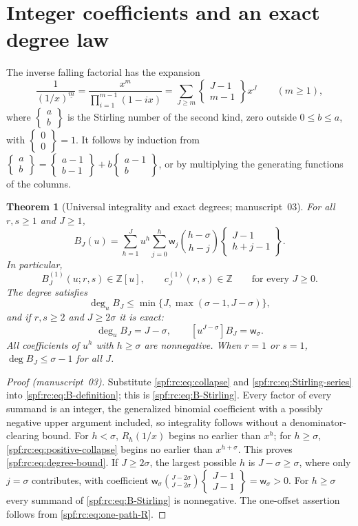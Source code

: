 \documentclass[11pt]{article}
\numberwithin{equation}{section}
\newtheorem{theorem}{Theorem}[section]
\theoremstyle{definition}
\theoremstyle{remark}
\theoremstyle{definition}
\newcommand{\Z}{\mathbb Z}
\newcommand{\fall}[2]{{#1}^{\underline{#2}}}
\newcommand{\rcw}{\mathsf w}
\newcommand{\Stir}[2]{\left\{\begin{matrix}#1\\#2\end{matrix}\right\}}
\begin{document}
\section{Integer coefficients and an exact degree law}
\label{spf:rc:sec:integrality}

The inverse falling factorial has the expansion
\begin{equation}
 \frac1{\fall{(1/x)}m}
 =\frac{x^m}{\prod_{i=1}^{m-1}(1-ix)}
 =\sum_{J\ge m}\Stir{J-1}{m-1}x^J\qquad(m\ge1),
 \label{spf:rc:eq:Stirling-series}
\end{equation}
where $\Stir ab$ is the Stirling number of the second kind, zero outside
$0\le b\le a$, with $\Stir00=1$. It follows by induction from
$\Stir ab=\Stir{a-1}{b-1}+b\Stir{a-1}b$, or by multiplying the generating
functions of the columns.

\begin{theorem}[Universal integrality and exact degrees; manuscript~03]
\label{spf:rc:thm:integrality}
For all $r,s\ge1$ and $J\ge1$,
\begin{equation}
 \boxed{\displaystyle
 B_J(u)=\sum_{h=1}^Ju^h\sum_{j=0}^h
       \rcw_j\binom{h-\sigma}{h-j}\Stir{J-1}{h+j-1}.}
 \label{spf:rc:eq:B-Stirling}
\end{equation}
In particular,
\begin{equation}
 B_J^{(1)}(u;r,s)\in\Z[u],\qquad c_J^{(1)}(r,s)\in\Z
                     \qquad\text{for every }J\ge0.
 \label{spf:rc:eq:integrality}
\end{equation}
The degree satisfies
\begin{equation}
 \deg_uB_J\le\min\{J,\max(\sigma-1,J-\sigma)\},
 \label{spf:rc:eq:degree-bound}
\end{equation}
and if $r,s\ge2$ and $J\ge2\sigma$ it is exact:
\begin{equation}
 \boxed{\deg_uB_J=J-\sigma,\qquad [u^{J-\sigma}]B_J=\rcw_\sigma.}
 \label{spf:rc:eq:sharp-degree}
\end{equation}
All coefficients of $u^h$ with $h\ge\sigma$ are nonnegative. When $r=1$ or
$s=1$, $\deg B_J\le\sigma-1$ for all $J$.
\end{theorem}

\begin{proof}[Proof (manuscript~03)]
Substitute \eqref{spf:rc:eq:collapse} and \eqref{spf:rc:eq:Stirling-series}
into \eqref{spf:rc:eq:B-definition}; this is \eqref{spf:rc:eq:B-Stirling}.
Every factor of every summand is an integer, the generalized binomial
coefficient with a possibly negative upper argument included, so
integrality follows without a denominator-clearing bound. For $h<\sigma$,
$R_h(1/x)$ begins no earlier than $x^h$; for $h\ge\sigma$,
\eqref{spf:rc:eq:positive-collapse} begins no earlier than $x^{h+\sigma}$.
This proves \eqref{spf:rc:eq:degree-bound}. If $J\ge2\sigma$, the largest
possible $h$ is $J-\sigma\ge\sigma$, where only $j=\sigma$ contributes, with
coefficient $\rcw_\sigma\binom{J-2\sigma}{J-2\sigma}\Stir{J-1}{J-1}=\rcw_\sigma>0$.
For $h\ge\sigma$ every summand of \eqref{spf:rc:eq:B-Stirling} is
nonnegative. The one-offset assertion follows from \eqref{spf:rc:eq:one-path-R}.
\end{proof}
\end{document}
